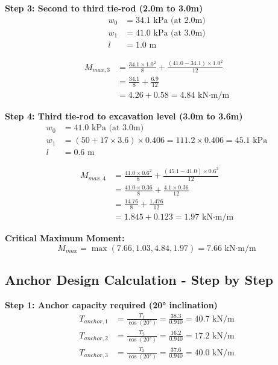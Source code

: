 \documentclass[10pt,a4paper,twocolumn]{article}
\begin{document}
\textbf{Step 3: Second to third tie-rod (2.0m to 3.0m)}
\begin{align}
w_0 &= 34.1 \text{ kPa (at 2.0m)} \\
w_1 &= 41.0 \text{ kPa (at 3.0m)} \\
l &= 1.0 \text{ m}
\end{align}

\begin{align}
M_{max,3} &= \frac{34.1 \times 1.0^2}{8} + \frac{(41.0 - 34.1) \times 1.0^2}{12} \\
&= \frac{34.1}{8} + \frac{6.9}{12} \\
&= 4.26 + 0.58 = 4.84 \text{ kN·m/m}
\end{align}

\textbf{Step 4: Third tie-rod to excavation level (3.0m to 3.6m)}
\begin{align}
w_0 &= 41.0 \text{ kPa (at 3.0m)} \\
w_1 &= (50 + 17 \times 3.6) \times 0.406 = 111.2 \times 0.406 = 45.1 \text{ kPa} \\
l &= 0.6 \text{ m}
\end{align}

\begin{align}
M_{max,4} &= \frac{41.0 \times 0.6^2}{8} + \frac{(45.1 - 41.0) \times 0.6^2}{12} \\
&= \frac{41.0 \times 0.36}{8} + \frac{4.1 \times 0.36}{12} \\
&= \frac{14.76}{8} + \frac{1.476}{12} \\
&= 1.845 + 0.123 = 1.97 \text{ kN·m/m}
\end{align}

\textbf{Critical Maximum Moment:}
\begin{equation}
M_{max} = \max(7.66, 1.03, 4.84, 1.97) = 7.66 \text{ kN·m/m}
\end{equation}

\subsection{Anchor Design Calculation - Step by Step}

\textbf{Step 1: Anchor capacity required (20° inclination)}
\begin{align}
T_{anchor,1} &= \frac{T_1}{\cos(20°)} = \frac{38.3}{0.940} = 40.7 \text{ kN/m} \\
T_{anchor,2} &= \frac{T_2}{\cos(20°)} = \frac{16.2}{0.940} = 17.2 \text{ kN/m} \\
T_{anchor,3} &= \frac{T_3}{\cos(20°)} = \frac{37.6}{0.940} = 40.0 \text{ kN/m}
\end{align}
\end{document}
